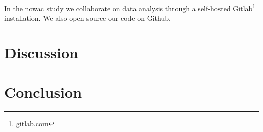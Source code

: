 In the \gls{nowac} study we collaborate on data analysis through a self-hosted
Gitlab\footnote{\url{gitlab.com}} installation. We also open-source our code on
Github. 

\section{Discussion}

\section{Conclusion}





